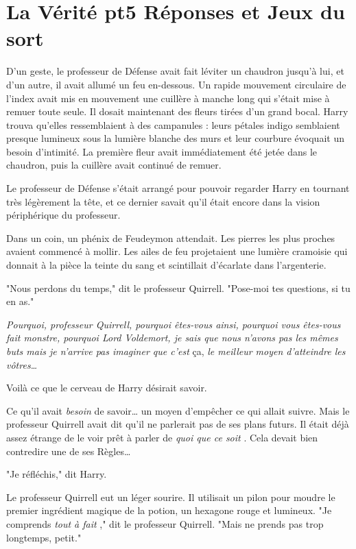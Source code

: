 
\chapter{La Vérité pt5   Réponses et Jeux du sort}

D'un geste, le professeur de Défense avait fait léviter un chaudron jusqu'à lui, et d'un autre, il avait allumé un feu en-dessous. Un rapide mouvement circulaire de l'index avait mis en mouvement une cuillère à manche long qui s'était mise à remuer toute seule. Il dosait maintenant des fleurs tirées d'un grand bocal. Harry trouva qu'elles ressemblaient à des campanules : leurs pétales indigo semblaient presque lumineux sous la lumière blanche des murs et leur courbure évoquait un besoin d'intimité. La première fleur avait immédiatement été jetée dans le chaudron, puis la cuillère avait continué de remuer.

Le professeur de Défense s'était arrangé pour pouvoir regarder Harry en tournant très légèrement la tête, et ce dernier savait qu'il était encore dans la vision périphérique du professeur.

Dans un coin, un phénix de Feudeymon attendait. Les pierres les plus proches avaient commencé à mollir. Les ailes de feu projetaient une lumière cramoisie qui donnait à la pièce la teinte du sang et scintillait d'écarlate dans l'argenterie.

"Nous perdons du temps," dit le professeur Quirrell. "Pose-moi tes questions, si tu en as."

\emph{Pourquoi, professeur Quirrell, pourquoi êtes-vous ainsi, pourquoi vous êtes-vous fait monstre, pourquoi Lord Voldemort, je sais que nous n'avons pas les mêmes buts mais je n'arrive pas imaginer que c'est}  ça, \emph{le meilleur moyen d'atteindre les vôtres…} 

Voilà ce que le cerveau de Harry désirait savoir.

Ce qu'il avait \emph{besoin}  de savoir… un moyen d'empêcher ce qui allait suivre. Mais le professeur Quirrell avait dit qu'il ne parlerait pas de ses plans futurs. Il était déjà assez étrange de le voir prêt à parler de \emph{quoi que ce soit} . Cela devait bien contredire une de ses Règles…

"Je réfléchis," dit Harry.

Le professeur Quirrell eut un léger sourire. Il utilisait un pilon pour moudre le premier ingrédient magique de la potion, un hexagone rouge et lumineux. "Je comprends \emph{tout à fait} ," dit le professeur Quirrell. "Mais ne prends pas trop longtemps, petit."


